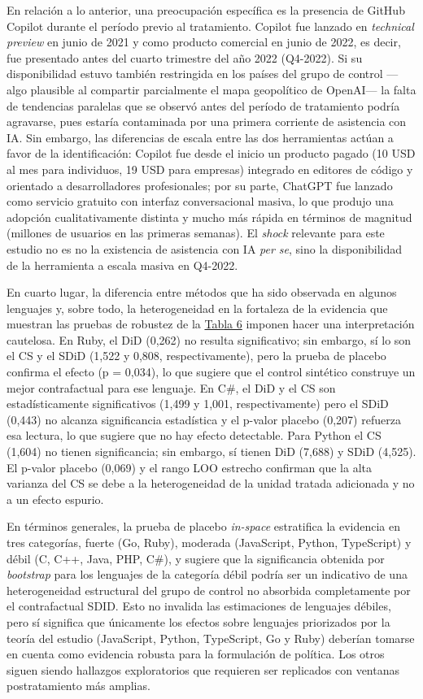 \documentclass[12pt,a4paper]{article}
\begin{document}
En relación a lo anterior, una preocupación específica es la presencia de GitHub Copilot durante el período previo al tratamiento. Copilot fue lanzado en \textit{technical preview} en junio de 2021 y como producto comercial en junio de 2022, es decir, fue presentado antes del cuarto trimestre del año 2022 (Q4-2022). Si su disponibilidad estuvo también restringida en los países del grupo de control ---algo plausible al compartir parcialmente el mapa geopolítico de OpenAI--- la falta de tendencias paralelas que se observó antes del período de tratamiento podría agravarse, pues estaría contaminada por una primera corriente de asistencia con IA. Sin embargo, las diferencias de escala entre las dos herramientas actúan a favor de la identificación: Copilot fue desde el inicio un producto pagado (10 USD al mes para individuos, 19 USD para empresas) integrado en editores de código y orientado a desarrolladores profesionales; por su parte, ChatGPT fue lanzado como servicio gratuito con interfaz conversacional masiva, lo que produjo una adopción cualitativamente distinta y mucho más rápida en términos de magnitud (millones de usuarios en las primeras semanas). El \textit{shock} relevante para este estudio no es no la existencia de asistencia con IA \textit{per se}, sino la disponibilidad de la herramienta a escala masiva en Q4-2022.

En cuarto lugar, la diferencia entre métodos que ha sido observada en algunos lenguajes y, sobre todo, la heterogeneidad en la fortaleza de la evidencia que muestran las pruebas de robustez de la \hyperref[tab:tabla6]{Tabla 6} imponen hacer una interpretación cautelosa. En Ruby, el DiD (0,262) no resulta significativo; sin embargo, sí lo son el CS y el SDiD (1,522 y 0,808, respectivamente), pero la prueba de placebo confirma el efecto (p = 0,034), lo que sugiere que el control sintético construye un mejor contrafactual para ese lenguaje. En C\#, el DiD y el CS son estadísticamente significativos (1,499 y 1,001, respectivamente) pero el SDiD (0,443) no alcanza significancia estadística y el p-valor placebo (0,207) refuerza esa lectura, lo que sugiere que no hay efecto detectable. Para Python el CS (1,604) no tienen significancia; sin embargo, sí tienen DiD (7,688) y SDiD (4,525). El p-valor placebo (0,069) y el rango LOO estrecho confirman que la alta varianza del CS se debe a la heterogeneidad de la unidad tratada adicionada y no a un efecto espurio.

En términos generales, la prueba de placebo \textit{in-space} estratifica la evidencia en tres categorías, fuerte (Go, Ruby), moderada (JavaScript, Python, TypeScript) y débil (C, C++, Java, PHP, C\#), y sugiere que la significancia obtenida por \textit{bootstrap} para los lenguajes de la categoría débil podría ser un indicativo de una heterogeneidad estructural del grupo de control no absorbida completamente por el contrafactual SDID. Esto no invalida las estimaciones de lenguajes débiles, pero sí significa que únicamente los efectos sobre lenguajes priorizados por la teoría del estudio (JavaScript, Python, TypeScript, Go y Ruby) deberían tomarse en cuenta como evidencia robusta para la formulación de política. Los otros siguen siendo hallazgos exploratorios que requieren ser replicados con ventanas postratamiento más amplias. 
\end{document}
